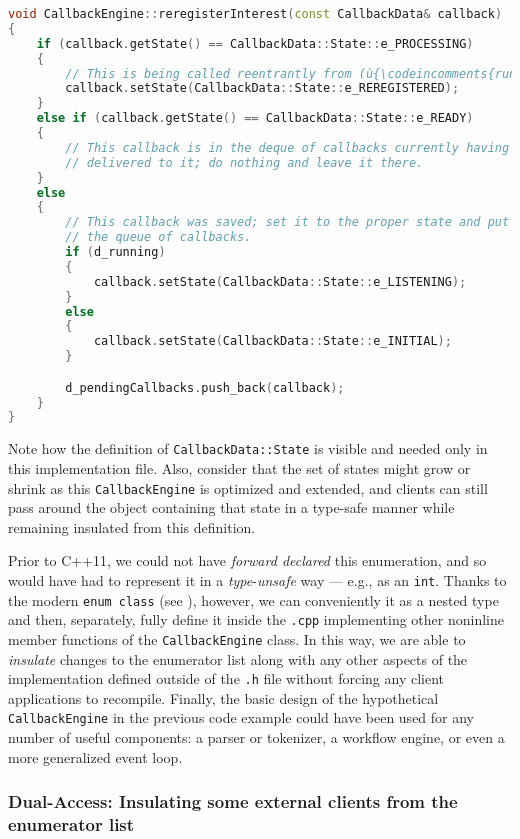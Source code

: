 \begin{lstlisting}[language=C++]
void CallbackEngine::reregisterInterest(const CallbackData& callback)
{
    if (callback.getState() == CallbackData::State::e_PROCESSING)
    {
        // This is being called reentrantly from (ù{\codeincomments{run()}}ù); simply update state.
        callback.setState(CallbackData::State::e_REREGISTERED);
    }
    else if (callback.getState() == CallbackData::State::e_READY)
    {
        // This callback is in the deque of callbacks currently having events
        // delivered to it; do nothing and leave it there.
    }
    else
    {
        // This callback was saved; set it to the proper state and put it in
        // the queue of callbacks.
        if (d_running)
        {
            callback.setState(CallbackData::State::e_LISTENING);
        }
        else
        {
            callback.setState(CallbackData::State::e_INITIAL);
        }

        d_pendingCallbacks.push_back(callback);
    }
}

\end{lstlisting}

\noindent Note how the definition of \lstinline!CallbackData::State! is visible and
needed only in this implementation file. Also, consider that the set of
states might grow or shrink as this \lstinline!CallbackEngine! is optimized
and extended, and clients can still pass around the object containing
that state in a type-safe manner while remaining insulated from this
definition.

Prior to C++11, we could not have \emph{forward declared} this
enumeration, and so would have had to represent it in a
\emph{type}-\emph{unsafe} way --- e.g., as an \lstinline!int!. Thanks to
the modern \lstinline!enum!~\lstinline!class! (see ), however, we can
conveniently  it as a nested type and then,
separately, fully define it inside the \lstinline!.cpp! implementing other
noninline member functions of the \lstinline!CallbackEngine! class. In
this way, we are able to \emph{insulate} changes to the enumerator list
along with any other aspects of the implementation defined outside of
the \lstinline!.h! file without forcing any client applications to
recompile. Finally, the basic design of the hypothetical \lstinline!CallbackEngine!
in the previous code example could have been used for any number of
useful components: a parser or tokenizer, a workflow engine, or even a
more generalized event loop.

\subsubsection[Dual-Access: Insulating some external clients from the enumerator list]{Dual-Access: Insulating some external clients from the enumerator list}\label{dual-access:-insulating-some-external-clients-from-the-enumerator-list}

